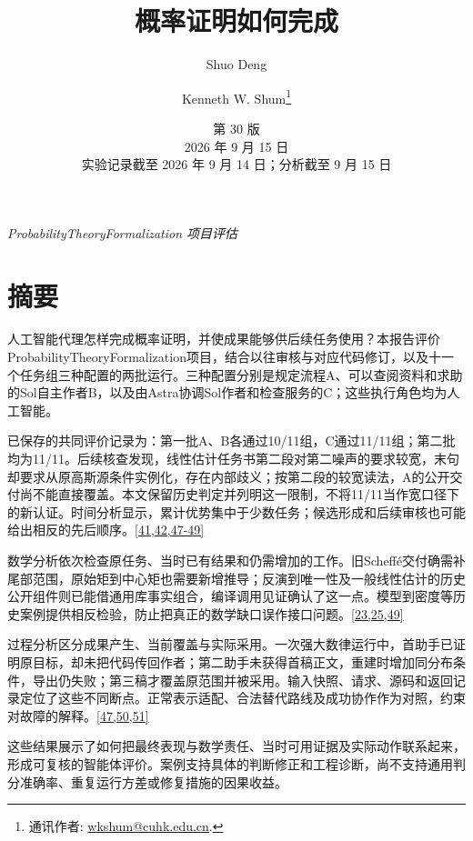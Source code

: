 
\title{概率证明如何完成}
\author{Shuo Deng \and Kenneth W. Shum\thanks{通讯作者: \href{mailto:wkshum@cuhk.edu.cn}{wkshum@cuhk.edu.cn}.}}\date{第 30 版\\2026 年 9 月 15 日\\实验记录截至 2026 年 9 月 14 日；分析截至 9 月 15 日}
\maketitle
\emph{ProbabilityTheoryFormalization 项目评估}

\section*{\texorpdfstring{\protect\hypertarget{abstract}{}摘要}{摘要}}
人工智能代理怎样完成概率证明，并使成果能够供后续任务使用？本报告评价ProbabilityTheoryFormalization项目，结合以往审核与对应代码修订，以及十一个任务组三种配置的两批运行。三种配置分别是规定流程A、可以查阅资料和求助的Sol自主作者B，以及由Astra协调Sol作者和检查服务的C；这些执行角色均为人工智能。

已保存的共同评价记录为：第一批A、B各通过10/11组，C通过11/11组；第二批均为11/11。后续核查发现，线性估计任务书第二段对第二噪声的要求较宽，末句却要求从原高斯源条件实例化，存在内部歧义；按第二段的较宽读法，A的公开交付尚不能直接覆盖。本文保留历史判定并列明这一限制，不将11/11当作宽口径下的新认证。时间分析显示，累计优势集中于少数任务；候选形成和后续审核也可能给出相反的先后顺序。\hyperlink{ref-41}{\mbox{[41,42,47-49]}}

数学分析依次检查原任务、当时已有结果和仍需增加的工作。旧Scheffé交付确需补尾部范围，原始矩到中心矩也需要新增推导；反演到唯一性及一般线性估计的历史公开组件则已能借通用库事实组合，编译调用见证确认了这一点。模型到密度等历史案例提供相反检验，防止把真正的数学缺口误作接口问题。\hyperlink{ref-23}{\mbox{[23,25,49]}}

过程分析区分成果产生、当前覆盖与实际采用。一次强大数律运行中，首助手已证明原目标，却未把代码传回作者；第二助手未获得首稿正文，重建时增加同分布条件，导出仍失败；第三稿才覆盖原范围并被采用。输入快照、请求、源码和返回记录定位了这些不同断点。正常表示适配、合法替代路线及成功协作作为对照，约束对故障的解释。\hyperlink{ref-47}{\mbox{[47,50,51]}}

这些结果展示了如何把最终表现与数学责任、当时可用证据及实际动作联系起来，形成可复核的智能体评价。案例支持具体的判断修正和工程诊断，尚不支持通用判分准确率、重复运行方差或修复措施的因果收益。

